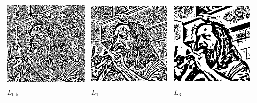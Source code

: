 \begin{tabular}{lll}
	\includegraphics{weiro-la.png} &
	\includegraphics{weiro-lb.png} &
	\includegraphics{weiro-lc.png} \\
	$L_{0.5}$ &
	$L_{1}$ &
	$L_{3}$ \\
\end{tabular}

